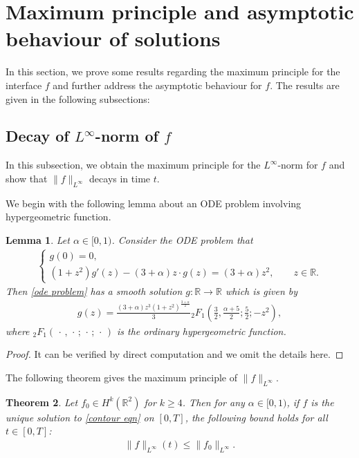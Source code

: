 \documentclass[reqno]{amsart}%
\newtheorem{thm}{Theorem}[section]
\newtheorem{lem}[thm]{Lemma}
\theoremstyle{definition}
\theoremstyle{remark}
\numberwithin{equation}{section}
\newcommand{\0}{\mathbf{0}}
\newcommand{\1}{\mathbf{1}}
\newcommand{\R}{\mathbb R}
\numberwithin{equation}{section}
\numberwithin{theorem}{section}
\numberwithin{figure}{section}
\begin{document}

\section{Maximum principle and asymptotic behaviour of solutions}\label{max principle and long time section}

In this section, we prove some results regarding the maximum principle for the interface $f$ and further address the asymptotic behaviour for $f$. The results are given in the following subsections:

\subsection{Decay of $L^\infty$-norm of $f$}

In this subsection, we obtain the maximum principle for the $L^\infty$-norm for $f$ and show that $\|f\|_{L^\infty}$ decays in time $t$.

We begin with the following lemma about an ODE problem involving hypergeometric function.
\begin{lem}\label{ode lemma}
Let $\alpha\in[0,1)$. Consider the ODE problem that
\begin{align}
\label{ode problem} 
\left\{ \begin{array}{l}
g(0)=0, \\
{(1+z^2)g'(z) - (3+\alpha)z \cdot g(z) = (3+\alpha)z^2,\qquad z\in\R.}
\end{array}\right.
\end{align}
Then \eqref{ode problem} has a smooth solution $g:\R\to\R$ which is given by
\begin{align}\label{explicit form for ode solution}
g(z)=\frac{(3+\alpha)z^3(1+z^2)^\frac{3+\alpha}{2}}{3}{}_2F_1 \left( \frac{3}{2}, \frac{\alpha + 5}{2}; \frac{5}{2}; - z^{2} \right),
\end{align}
where ${}_2F_1(\,\cdot\,,\,\cdot\,;\,\cdot\,;\,\cdot\,)$ is the ordinary hypergeometric function.
\end{lem}
\begin{proof}
It can be verified by direct computation and we omit the details here.
\end{proof}

The following theorem gives the maximum principle of $\|f\|_{L^\infty}$.

\begin{thm}\label{max principle thm}
Let $f_0\in H^k(\R^2)$ for $k\ge4$. Then for any $\alpha\in[0,1)$, if $f$ is the unique solution to \eqref{contour eqn} on $[0,T]$, the following bound holds for all $t\in[0,T]$:
\begin{align}\label{max principle for f}
\|f\|_{L^\infty}(t)\le\|f_0\|_{L^\infty}.
\end{align}
\end{thm}
\end{document}
